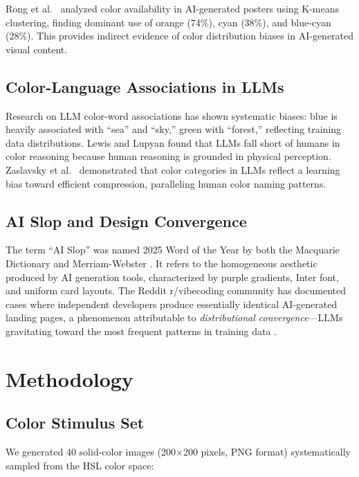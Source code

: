 \documentclass[11pt,a4paper]{article}
\begin{document}
Rong et al.\ \cite{rong2024} analyzed color availability in AI-generated posters using K-means clustering, finding dominant use of orange (74\%), cyan (38\%), and blue-cyan (28\%). This provides indirect evidence of color distribution biases in AI-generated visual content.

\subsection{Color-Language Associations in LLMs}

Research on LLM color-word associations \cite{springer2025} has shown systematic biases: blue is heavily associated with ``sea'' and ``sky,'' green with ``forest,'' reflecting training data distributions. Lewis and Lupyan \cite{stanford2025} found that LLMs fall short of humans in color reasoning because human reasoning is grounded in physical perception. Zaslavsky et al.\ \cite{arxiv2509} demonstrated that color categories in LLMs reflect a learning bias toward efficient compression, paralleling human color naming patterns.

\subsection{AI Slop and Design Convergence}

The term ``AI Slop'' was named 2025 Word of the Year by both the Macquarie Dictionary and Merriam-Webster \cite{macquarie2025}. It refers to the homogeneous aesthetic produced by AI generation tools, characterized by purple gradients, Inter font, and uniform card layouts. The Reddit r/vibecoding community has documented cases where independent developers produce essentially identical AI-generated landing pages, a phenomenon attributable to \textit{distributional convergence}---LLMs gravitating toward the most frequent patterns in training data \cite{bommasani2021}.

\section{Methodology}

\subsection{Color Stimulus Set}

We generated 40 solid-color images (200$\times$200 pixels, PNG format) systematically sampled from the HSL color space:
\end{document}
